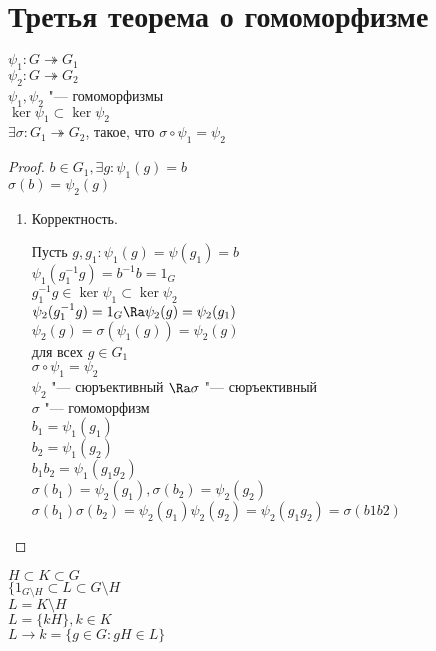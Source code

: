 ﻿\section{Третья теорема о гомоморфизме}
\begin{theorem}
$\psi_1 \colon G \twoheadrightarrow G_1$ \\
$\psi_2 \colon G \twoheadrightarrow G_2$ \\
$\psi_1, \psi_2$ "--- гомоморфизмы\\
$\ker \psi_1 \subset \ker \psi_2$\\
$\exists \sigma \colon G_1 \twoheadrightarrow G_2$, такое, что $\sigma \circ \psi_1 = \psi_2$\\
\end{theorem}
\begin{proof}
$b \in G_1, \exists g \colon \psi_1(g) = b$\\
$\sigma (b) = \psi_2(g)$\\

\begin{enumerate}
\item Корректность.

Пусть $g, g_1 \colon \psi_1(g) = \psi(g_1) = b$\\
$\psi_1(g_1^{-1}g) = b^{-1}b = 1_G$\\
$g_1^{-1}g \in \ker \psi_1 \subset \ker \psi_2$\\
$\psi_2(g_1^{-1}g) = 1_G \Ra \psi_2(g) = \psi_2(g_1)$\\

$\psi_2(g) = \sigma(\psi_1(g)) = \psi_2(g)$\\
для всех $g \in G_1$\\
$\sigma \circ \psi_1 = \psi_2$\\
$\psi_2$ "--- сюръективный $\Ra \sigma$ "--- сюръективный\\

$\sigma$ "--- гомоморфизм\\
$b_1 = \psi_1(g_1)$\\
$b_2 = \psi_1(g_2)$\\
$b_1b_2 = \psi_1(g_1g_2)$\\

$\sigma(b_1) = \psi_2(g_1), \sigma(b_2) = \psi_2(g_2)$\\
$\sigma(b_1)\sigma(b_2) = \psi_2(g_1) \psi_2(g_2) = \psi_2(g_1g_2) = \sigma(b1b2)$\\
\end{enumerate}
\end{proof}
\begin{Rem}
$H\subset K \subset G$\\
$\{1_{G\setminus H}\subset L \subset G \setminus H$ \\
$L = K \setminus H$\\
$L = \{kH\}, k \in K$\\
$L \to k = \{g \in G \colon gH \in L\}$\\
\end{Rem}

